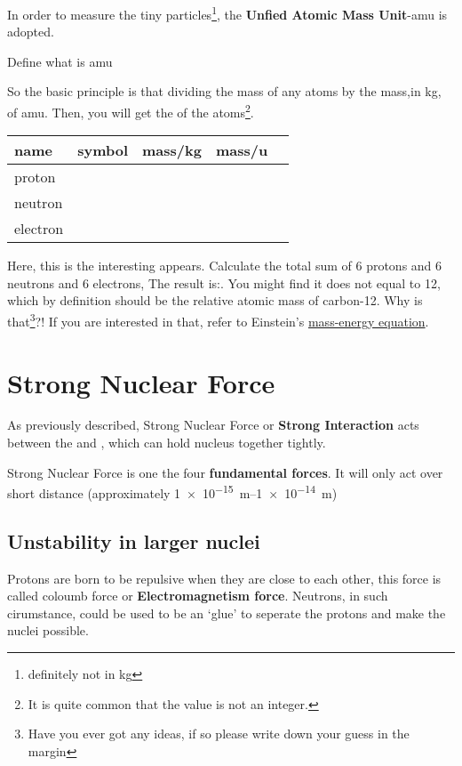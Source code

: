 \documentclass[a4paper]{tufte-handout}
\newenvironment{SummBox}
{\begin{tcolorbox}[breakable,colback=r1!30,colframe=r1,title=Summary]} {\end{tcolorbox}}
\begin{document}
In order to measure the tiny particles\footnote{definitely not in \si{\kg}}, the \textbf{Unfied Atomic Mass Unit}-amu is adopted.
\begin{SummBox}
Define what is amu
\vspace{0.5in} 
\end{SummBox}

So the basic principle is that dividing the mass of any atoms by the mass,in \si{\kg}, of amu. Then, you will get the \uline{\hspace{1in}} of the atoms\footnote{It is quite common that the value is not an integer.}.

\begin{table}[h]
\begin{tabular}{|l|l|l|l|l|}
\hline
name    & symbol & mass/\si{\kg} & mass/\si{\amu} \\ \hline
proton   &        &      &        \\ \hline
neutron  &        &      &        \\ \hline
electron &        &      &        \\ \hline
\end{tabular}
\end{table}

Here, this is the interesting appears.
Calculate the total sum of 6 protons and 6 neutrons and 6 electrons, The result is:\uline{\hspace{1in}}. You might find it does not equal to 12, which by definition should be the relative atomic mass of carbon-12. Why is that\footnote{Have you ever got any ideas, if so please write down your guess in the margin}?! If you are interested in that, refer to Einstein's \href{https://www.atomicarchive.com/science/physics/einsteins-equation.html}{mass-energy equation}. 


\section{Strong Nuclear Force}
As previously described, \textcolor{r1}{Strong Nuclear Force} or \textbf{Strong Interaction} acts between the \uline{\hspace{1in}} and \uline{\hspace{1in}}, which can hold nucleus together tightly.

Strong Nuclear Force is one the four \textbf{fundamental forces}. It will only act over short distance (approximately \SIrange{1e-15}{1e-14}{\m})

\subsection{Unstability in larger nuclei}
Protons are born to be repulsive when they are close to each other, this force is called coloumb force or \textbf{Electromagnetism force}. Neutrons, in such cirumstance, could be used to be an `glue' to seperate the protons and make the nuclei possible.
\end{document}
